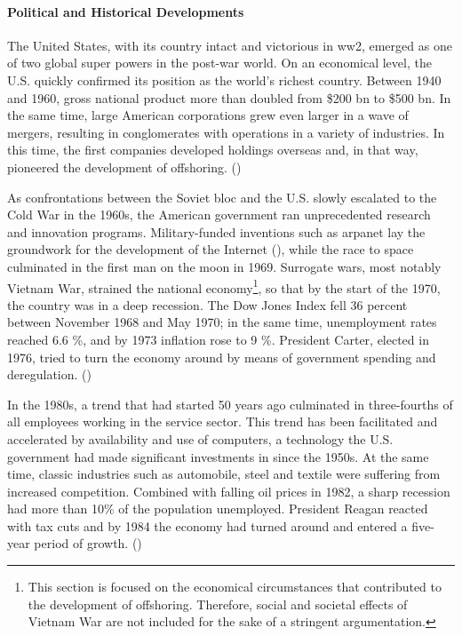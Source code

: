 \paragraph{Political and Historical Developments} \label{par:USHistory}
The United States, with its country intact and victorious in \gls{ww2}, emerged as one of two global super powers in the post-war world. On an economical level, the U.S. quickly confirmed its position as the world's richest country. Between 1940 and 1960, gross national product more than doubled from \$200 \nolinebreak bn to \$500 \nolinebreak bn. In the same time, large American corporations grew even larger in a wave of mergers, resulting in conglomerates with operations in a variety of industries. In this time, the first companies developed holdings overseas and, in that way, pioneered the development of offshoring. (\cite{Winkler.1994b})

As confrontations between the Soviet bloc and the U.S. slowly escalated to the Cold War in the 1960s, the American government ran unprecedented research and innovation programs. Military-funded inventions such as \acrshort{arpanet} lay the groundwork for the development of the Internet (\cite{Leiner.2003}), while the race to space culminated in the first man on the moon in 1969. Surrogate wars, most notably Vietnam War, strained the national economy\footnote{This section is focused on the economical circumstances that contributed to the development of offshoring. Therefore, social and societal effects of Vietnam War are not included for the sake of a stringent argumentation.}, so that by the start of the 1970, the country was in a deep recession. The Dow Jones Index fell 36 percent between November 1968 and May 1970; in the same time, unemployment rates reached 6.6 \%, and by 1973 inflation rose to 9 \%. President Carter, elected in 1976, tried to turn the economy around by means of government spending and deregulation.
(\cite{Winkler.1994})


In the 1980s, a trend that had started 50 years ago culminated in three-fourths of all employees working in the service sector. This trend has been facilitated and accelerated by availability and use of computers, a technology the U.S. government had made significant investments in since the 1950s. At the same time, classic industries such as automobile, steel and textile were suffering from increased competition. Combined with falling oil prices in 1982, a sharp recession had more than 10\% of the population unemployed. President Reagan reacted with tax cuts and by 1984 the economy had turned around and entered a five-year period of growth.
(\cite{Winkler.1994c})

